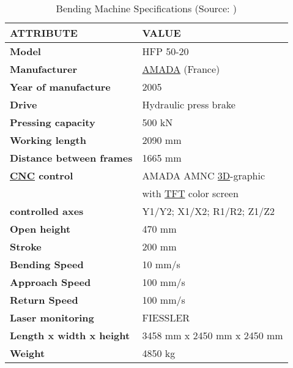 \begin{table}[h!]
    \centering
    \begin{tabular}{ll}
        \MakeUppercase{\textbf{Attribute}} & \MakeUppercase{\textbf{Value}} \\
        \hline
        \textbf{Model} & HFP 50-20 \\
        \textbf{Manufacturer} & \hyperref[acro:AMADA]{AMADA} (France) \\
        \textbf{Year of manufacture} & 2005 \\
        \textbf{Drive} & Hydraulic press brake \\
        \textbf{Pressing capacity} & 500 kN \\
        \textbf{Working length} & 2090 mm \\
        \textbf{Distance between frames} & 1665 mm \\
        \textbf{\hyperref[acro:CNC]{CNC} control} & AMADA AMNC \hyperref[acro:3D]{3D}-graphic \\
        & with \hyperref[acro:TFT]{TFT} color screen \\
        \textbf{controlled axes} &  Y1/Y2; X1/X2; R1/R2; Z1/Z2 \\
        \textbf{Open height} & 470 mm \\
        \textbf{Stroke} & 200 mm \\
        \textbf{Bending Speed} & 10 mm/s \\
        \textbf{Approach Speed} & 100 mm/s \\
        \textbf{Return Speed} & 100 mm/s \\
        \textbf{Laser monitoring} & FIESSLER \\
        \textbf{Length x width x height} & 3458 mm x 2450 mm x 2450 mm \\
        \textbf{Weight} & 4850 kg \\ \hline
    \end{tabular}
    \caption{Bending Machine Specifications (Source: \cite{bmspecifications})}
    \label{tab:machine_specifications}
\end{table}
